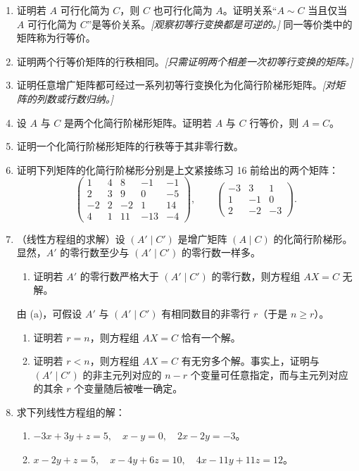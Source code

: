 \begin{enumerate}[label=\arabic*.,resume]
\item 证明若 $A$ 可行化简为 $C$，则 $C$ 也可行化简为 $A$。证明关系“$A\sim C$ 当且仅当 $A$ 可行化简为 $C$”是等价关系。\emph{[观察初等行变换都是可逆的。]} 同一等价类中的矩阵称为行等价。
\item 证明两个行等价矩阵的行秩相同。\emph{[只需证明两个相差一次初等行变换的矩阵。]}
\item 证明任意增广矩阵都可经过一系列初等行变换化为化简行阶梯形矩阵。\emph{[对矩阵的列数或行数归纳。]}
\item 设 $A$ 与 $C$ 是两个化简行阶梯形矩阵。证明若 $A$ 与 $C$ 行等价，则 $A=C$。
\item 证明一个化简行阶梯形矩阵的行秩等于其非零行数。
\item 证明下列矩阵的化简行阶梯形分别是上文紧接练习 16 前给出的两个矩阵：
\[
\begin{pmatrix}
1&4&8&-1&-1\\
2&3&9&0&-5\\
-2&2&-2&1&14\\
4&1&11&-13&-4
\end{pmatrix},
\qquad
\begin{pmatrix}
-3&3&1\\
1&-1&0\\
2&-2&-3
\end{pmatrix}.
\]
\item （线性方程组的求解）设 $(A'\mid C')$ 是增广矩阵 $(A\mid C)$ 的化简行阶梯形。显然，$A'$ 的零行数至少与 $(A'\mid C')$ 的零行数一样多。
\begin{enumerate}[label=(\alph*)]
\item 证明若 $A'$ 的零行数严格大于 $(A'\mid C')$ 的零行数，则方程组 $AX=C$ 无解。
\end{enumerate}
由 (a)，可假设 $A'$ 与 $(A'\mid C')$ 有相同数目的非零行 $r$（于是 $n\geq r$）。
\begin{enumerate}[label=(\alph*),resume]
\item 证明若 $r=n$，则方程组 $AX=C$ 恰有一个解。
\item 证明若 $r<n$，则方程组 $AX=C$ 有无穷多个解。事实上，证明与 $(A'\mid C')$ 的非主元列对应的 $n-r$ 个变量可任意指定，而与主元列对应的其余 $r$ 个变量随后被唯一确定。
\end{enumerate}
\item 求下列线性方程组的解：
\begin{enumerate}[label=(\alph*)]
\item $-3x+3y+z=5,\quad x-y=0,\quad 2x-2y=-3$。
\item $x-2y+z=5,\quad x-4y+6z=10,\quad 4x-11y+11z=12$。

\end{enumerate}
\end{enumerate}
